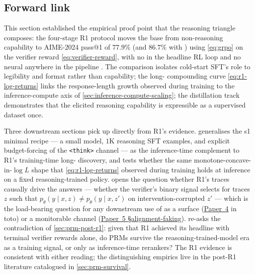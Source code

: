 \subsection{Forward link}
\label{sec:r1-forward}

This section established the empirical proof point that the
reasoning triangle composes: the four-stage R1 protocol moves the
 base from non-reasoning capability to AIME-2024 pass@1
of $77.9\%$ (and $86.7\%$ with ) using 
\cref{eq:grpo} on the verifier reward \cref{eq:verifier-reward}, with
no  in the headline RL loop and no neural  anywhere
in the pipeline \citep[\S 2.2]{deepseek-r1}. The  comparison
isolates cold-start SFT's role to legibility and format rather than
capability; the long- compounding curve \cref{eq:r1-log-returns}
links the response-length growth observed during training to the
inference-compute axis of \cref{sec:inference-compute-scaling}; the
distillation track \citep[\S 4]{deepseek-r1} demonstrates that the
elicited reasoning capability is expressible as a supervised dataset
once.

Three downstream sections pick up directly from R1's evidence.
 generalises the s1 \citep{s1-2025} minimal
recipe --- a small model, $1$K reasoning SFT examples, and explicit
budget-forcing of the \texttt{<think>} channel --- as the
inference-time complement to R1's training-time long- discovery,
and tests whether the same monotone-concave-in-$\log L$ shape that
\cref{eq:r1-log-returns} observed during training holds at inference
on a fixed reasoning-trained policy.
 opens the question whether R1's traces
causally drive the answers --- whether the verifier's binary signal
selects for traces $z$ such that
$p_\theta(y \mid x, z) \neq p_\theta(y \mid x, z')$ on
intervention-corrupted $z'$ --- which is the load-bearing question
for any downstream use of  as a  surface (\hyperref[P4-sec:introduction]{Paper~4}
in toto) or a monitorable channel (\hyperref[P5-sec:alignment-faking]{Paper~5 §alignment-faking}).
 re-asks the
contradiction of \cref{sec:prm-post-r1}: given that R1 achieved its
headline with terminal verifier rewards alone, do PRMs survive the
reasoning-trained-model era as a training signal, or only as
inference-time rerankers? The R1 evidence is consistent with either
reading; the distinguishing empirics live in the post-R1 
literature catalogued in \cref{sec:prm-survival}.

